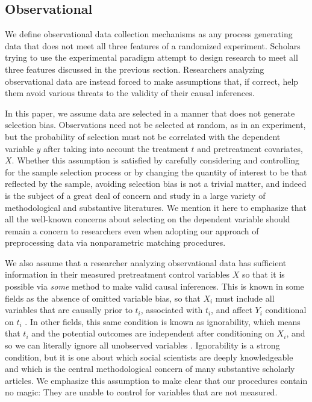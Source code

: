 \documentclass[11pt,titlepage]{article}
\begin{document}
\subsection{Observational}

We define observational data collection mechanisms as any process
generating data that does not meet all three features of a randomized
experiment.  Scholars trying to use the experimental paradigm attempt
to design research to meet all three features discussed in the
previous section.  Researchers analyzing observational data are
instead forced to make assumptions that, if correct, help them avoid
various threats to the validity of their causal inferences.

In this paper, we assume data are selected in a manner that does not
generate selection bias.  Observations need not be selected at random,
as in an experiment, but the probability of selection must not be
correlated with the dependent variable $y$ after taking into account
the treatment $t$ and pretreatment covariates, $X$.  Whether this
assumption is satisfied by carefully considering and controlling for
the sample selection process or by changing the quantity of interest
to be that reflected by the sample, avoiding selection bias is not a
trivial matter, and indeed is the subject of a great deal of concern
and study in a large variety of methodological and substantive
literatures.  We mention it here to emphasize that all the well-known
concerns about selecting on the dependent variable should remain a
concern to researchers even when adopting our approach of
preprocessing data via nonparametric matching procedures.

We also assume that a researcher analyzing observational data has
sufficient information in their measured pretreatment control
variables $X$ so that it is possible via \emph{some} method to make
valid causal inferences.  This is known in some fields as the absence
of omitted variable bias, so that $X_i$ must include all variables
that are causally prior to $t_i$, associated with $t_i$, and affect
$Y_i$ conditional on $t_i$ \citep{Goldberger91,KinKeoVer94}.  In other
fields, this same condition is known as ignorability, which means that
$t_i$ and the potential outcomes are independent after conditioning on
$X_i$, and so we can literally ignore all unobserved variables
\citep{RosRub83}.  Ignorability is a strong condition, but it is one
about which social scientists are deeply knowledgeable and which is
the central methodological concern of many substantive scholarly
articles.  We emphasize this assumption to make clear that our
procedures contain no magic: They are unable to control for variables
that are not measured.
\end{document}
